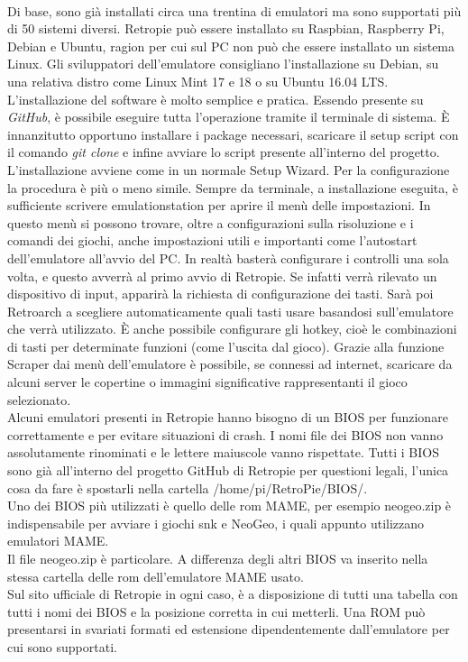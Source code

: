 \\Di base, sono già installati circa una trentina di emulatori ma sono supportati più di 50 sistemi diversi. Retropie può essere installato su Raspbian, Raspberry Pi, Debian e Ubuntu, ragion per cui sul PC non può che essere installato un sistema Linux. Gli sviluppatori dell’emulatore consigliano l’installazione su Debian, su una relativa distro come Linux Mint 17 e 18 o su Ubuntu 16.04 LTS.\\L’installazione del software è molto semplice e pratica. Essendo presente su \textit{GitHub}, è possibile eseguire tutta l’operazione tramite il terminale di sistema. È innanzitutto opportuno installare i package necessari, scaricare il setup script con il comando \textit{git clone} e infine avviare lo script presente all’interno del progetto. L’installazione avviene come in un normale Setup Wizard. Per la configurazione la procedura è più o meno simile. Sempre da terminale, a installazione eseguita, è sufficiente scrivere emulationstation per aprire il menù delle impostazioni. In questo menù si possono trovare, oltre a configurazioni sulla risoluzione e i comandi dei giochi, anche impostazioni utili e importanti come l’autostart dell’emulatore all’avvio del PC. In realtà basterà configurare i controlli una sola volta, e questo avverrà al primo avvio di Retropie. Se infatti verrà rilevato un dispositivo di input, apparirà la richiesta di configurazione dei tasti. Sarà poi Retroarch a scegliere automaticamente quali tasti usare basandosi sull’emulatore che verrà utilizzato. È anche possibile configurare gli hotkey, cioè le combinazioni di tasti per determinate funzioni (come l’uscita dal gioco). Grazie alla funzione Scraper dai menù dell’emulatore è possibile, se connessi ad internet, scaricare da alcuni server le copertine o immagini significative rappresentanti il gioco selezionato.\\Alcuni emulatori presenti in Retropie hanno bisogno di un BIOS per funzionare correttamente e per evitare situazioni di crash. I nomi file dei BIOS non vanno assolutamente rinominati e le lettere maiuscole vanno rispettate. Tutti i BIOS sono già all’interno del progetto GitHub di Retropie per questioni legali, l’unica cosa da fare è spostarli nella cartella /home/pi/RetroPie/BIOS/.\\Uno dei BIOS più utilizzati è quello delle rom MAME, per esempio neogeo.zip è indispensabile per avviare i giochi \gls{snk} e NeoGeo, i quali appunto utilizzano emulatori MAME.\\Il file neogeo.zip è particolare. A differenza degli altri BIOS va inserito nella stessa cartella delle rom dell’emulatore MAME usato.\\Sul sito ufficiale di Retropie in ogni caso, è a disposizione di tutti una tabella con tutti i nomi dei BIOS e la posizione corretta in cui metterli. Una ROM può presentarsi in svariati formati ed estensione dipendentemente dall’emulatore per cui sono supportati.
